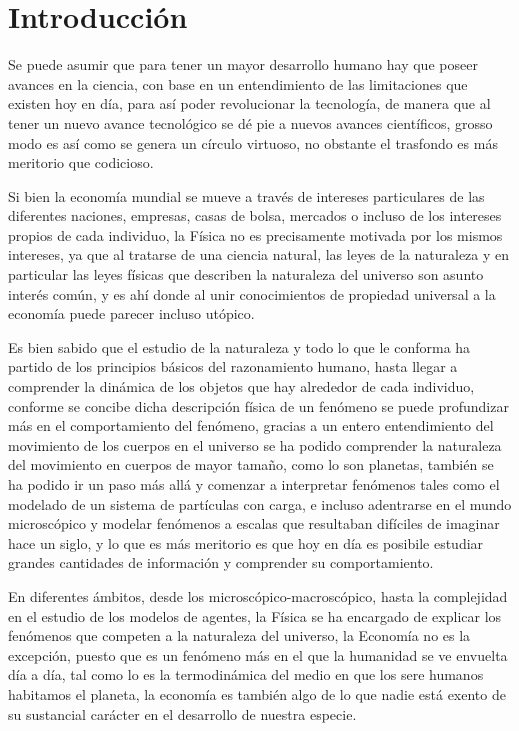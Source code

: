%
\chapter{Introducción}
\label{sec:intro}
Se puede asumir que para tener un mayor desarrollo humano hay que poseer avances en la ciencia, con base en un entendimiento de las limitaciones que existen hoy en día, para así poder revolucionar la tecnolog\'ia, de manera que al tener un nuevo avance tecnológico se dé pie a nuevos avances científicos, grosso modo es así como se genera un círculo virtuoso, no obstante el trasfondo es más meritorio que codicioso.
\newline

Si bien la economía mundial se mueve a través de intereses particulares de las diferentes naciones, empresas, casas de bolsa, mercados o incluso de los intereses propios de cada individuo, la Física no es precisamente motivada por los mismos intereses, ya que al tratarse de una ciencia natural, las leyes de la naturaleza y en particular las leyes físicas que describen la naturaleza del universo son asunto interés común, y es ahí donde al unir conocimientos de propiedad universal a la economía puede parecer incluso utópico. \newline

Es bien sabido que el estudio de la naturaleza y todo lo que le conforma ha partido de los principios básicos del razonamiento humano, hasta llegar a comprender la din\'amica de los objetos que hay alrededor de cada individuo, conforme se concibe dicha descripción f\'isica de un fen\'omeno se puede profundizar m\'as en el comportamiento del fenómeno, gracias a un entero entendimiento del movimiento de los cuerpos en el universo se ha podido comprender la naturaleza del movimiento en cuerpos de mayor tamaño, como lo son planetas, tambi\'en se ha podido ir un paso m\'as all\'a y comenzar a interpretar fen\'omenos tales como el modelado de un sistema de part\'iculas con carga, e incluso adentrarse en el mundo microsc\'opico y modelar fenómenos a escalas que resultaban dif\'iciles de imaginar hace un siglo, y lo que es más meritorio es que hoy en día es posibile estudiar grandes cantidades de información y comprender su comportamiento.
\newline


En diferentes \'ambitos, desde los microsc\'opico-macrosc\'opico, hasta la complejidad en el estudio de los modelos de agentes, la F\'isica se ha encargado de explicar los fen\'omenos que competen a la naturaleza del universo, la Econom\'ia no es la excepci\'on, puesto que es un fen\'omeno m\'as en el que la humanidad se ve envuelta d\'ia a d\'ia, tal como lo es la termodin\'amica del medio en que los sere humanos habitamos el planeta, la econom\'ia es tambi\'en algo de lo que nadie est\'a exento de su sustancial car\'acter en el desarrollo de nuestra especie.
\newline

